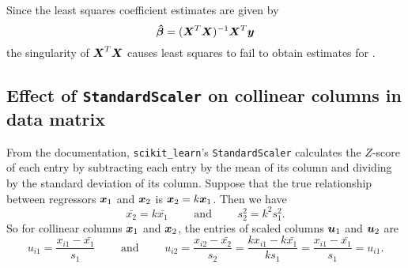 \documentclass[12pt]{article}
\newcommand{\gbh}{\hat{\gb}}
\begin{document}
	Since the least squares coefficient estimates are given by
	$$\boldsymbol{\gbh}=(\bmX^T\bmX)^{-1}\bmX^T\bmy$$
	the singularity of $\boldsymbol{X}^T\boldsymbol{X}$ causes least squares to fail to obtain estimates for .
	
	\subsection{Effect of \texttt{StandardScaler} on collinear columns in data matrix \label{sec:append4}}
	From the documentation, \texttt{scikit\_learn}'s \texttt{StandardScaler} calculates the $Z$-score of each entry by subtracting each entry by the mean of its column and dividing by the standard deviation of its column. Suppose that the true relationship between regressors $\boldsymbol{x}_1$ and $\boldsymbol{x}_2$ is $\boldsymbol{x}_2=k\boldsymbol{x}_1$. Then we have
	$$\bar{x_2}=k\bar{x_1}\quad \quad \text{ and }\quad \quad s^2_2=k^2s_1^2.$$
	So for collinear columns $\boldsymbol{x}_1$ and $\boldsymbol{x}_2$, the entries of scaled columns $\boldsymbol{u}_1$ and $\boldsymbol{u}_2$ are
	$$u_{i1}=\frac{x_{i1}-\bar{x_1}}{s_1}\quad\quad\text{ and }\quad \quad u_{i2}=\frac{x_{i2}-\bar{x_2}}{s_2}=\frac{kx_{i1}-k\bar{x_1}}{ks_1}=\frac{x_{i1}-\bar{x_1}}{s_1}=u_{i1}.$$
	
	
	
	
	
\end{document}
